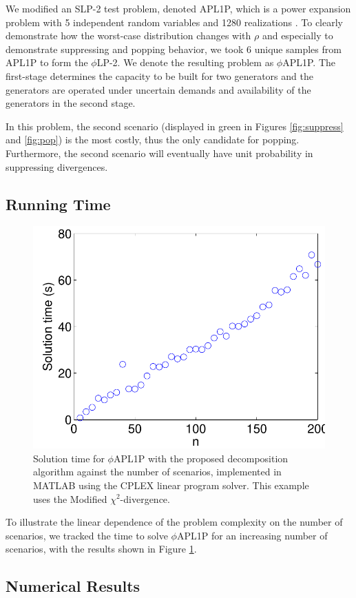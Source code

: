 \documentclass[12pt]{article}
\theoremstyle{plain}
\theoremstyle{definition}
\theoremstyle{remark}
\newcommand{\plp}{$\phi$LP-2}
\begin{document}
We modified an SLP-2 test problem, denoted APL1P, which is a power expansion problem with 5 independent random variables and 1280 realizations \citep{infanger1992monte}.
To clearly demonstrate how the worst-case distribution changes with $\rho$ and especially to demonstrate suppressing and popping behavior, we took 6 unique samples from APL1P to form the \plp. 
We denote the resulting problem as $\phi$APL1P. 
The first-stage determines the capacity to be built for two generators and the generators are operated under uncertain demands and availability of the generators in the second stage.

In this problem, the second scenario (displayed in green in Figures \ref{fig:suppress} and \ref{fig:pop}) is the most costly, thus the only candidate for popping. %
Furthermore, the second scenario will eventually have unit probability in suppressing divergences.

\subsection{Running Time}
\label{ssec:run_time}

\begin{figure}
	\FIGURE
	{%
		\includegraphics*[width=.45\textwidth]{images/runtime}
	}
	{
		Solution time for $\phi$APL1P with the proposed decomposition algorithm against the number of scenarios, implemented in MATLAB using the CPLEX linear program solver.
		This example uses the Modified $\chi^2$-divergence.
		\label{fig:runtime}
	}
	{}
\end{figure}

To illustrate the linear dependence of the problem complexity on the number of scenarios, we tracked the time to solve $\phi$APL1P for an increasing number of scenarios, with the results shown in Figure \ref{fig:runtime}.


\subsection{Numerical Results}
\label{ssec:numerical_results}
\end{document}
